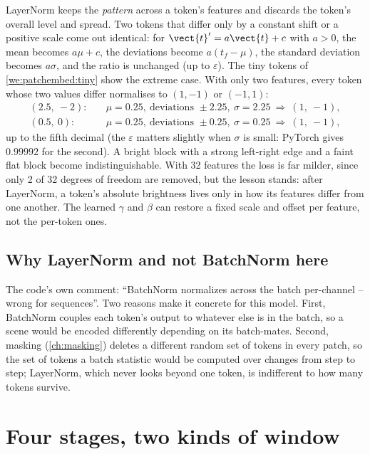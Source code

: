 LayerNorm keeps the \emph{pattern} across a token's features and discards the token's overall level and
spread. Two tokens that differ only by a constant shift or a positive scale come out identical: for
$\vect{t}' = a\vect{t} + c$ with $a>0$, the mean becomes $a\mu + c$, the deviations become
$a(t_f-\mu)$, the standard deviation becomes $a\sigma$, and the ratio is unchanged (up to $\varepsilon$).
The tiny tokens of \cref{we:patchembed:tiny} show the extreme case. With only two features, every token
whose two values differ normalises to $(1, -1)$ or $(-1, 1)$:
\begin{align*}
(2.5,\ -2):&\quad \mu = 0.25,\ \text{deviations } \pm2.25,\ \sigma = 2.25 \ \Rightarrow\ (1,\ -1),\\
(0.5,\ 0):&\quad \mu = 0.25,\ \text{deviations } \pm0.25,\ \sigma = 0.25 \ \Rightarrow\ (1,\ -1),
\end{align*}
up to the fifth decimal (the $\varepsilon$ matters slightly when $\sigma$ is small: PyTorch gives
$0.99992$ for the second\tagC). A bright block with a strong left-right edge and a faint flat block become indistinguishable. With 32
features the loss is far milder, since only 2 of 32 degrees of freedom are removed, but the lesson
stands: after LayerNorm, a token's absolute brightness lives only in how its features differ from one
another. The learned $\gamma$ and $\beta$ can restore a fixed scale and offset per feature, not the
per-token ones.

\subsection{Why LayerNorm and not BatchNorm here}

The code's own comment: ``BatchNorm normalizes across the batch per-channel -- wrong for sequences''.
Two reasons make it concrete for this model. First, BatchNorm couples each token's output to whatever
else is in the batch, so a scene would be encoded differently depending on its batch-mates. Second,
masking (\cref{ch:masking}) deletes a different random set of tokens in every patch, so the set of
tokens a batch statistic would be computed over changes from step to step; LayerNorm, which never looks
beyond one token, is indifferent to how many tokens survive.

\section{Four stages, two kinds of window}\label{sec:patchembed:stages}


